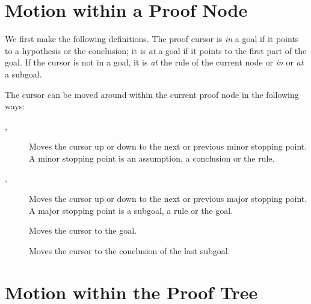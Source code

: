 \section{Motion within a Proof Node}

{}{}We first make the following definitions.
The proof{} cursor is {\em in} a goal if it
points to a hypothesis or the
conclusion;
it is {\em at} a goal if it points to the first part of the goal.
If the cursor is not in a goal, it is {\em at} the rule of the current node
or {\em in} or {\em at} a subgoal.

The cursor can be moved around within
the current proof node in the following ways:
\begin {description}
\item[\UP{}, \DOWN{}]{} \hfill \break
\noindent
    Moves the cursor up or down to the next or previous minor stopping point.
    A minor stopping point is an assumption, a conclusion or the rule.

\item[\LONG{} \UP{}, \LONG{} \DOWN{}]{} \hfill \break
\noindent
    Moves the cursor up or down to the next or previous major stopping point.
    A major stopping point is a subgoal, a rule or the goal.

\item[\LONG{} \LONG{} \UP{}]{} \hfill \break
\noindent
    Moves the cursor to the goal.

\item[\LONG{} \LONG{} \DOWN{}]{} \hfill \break
\noindent
Moves the cursor to the conclusion of the last subgoal.
\end {description}

\section{Motion within the Proof Tree}

